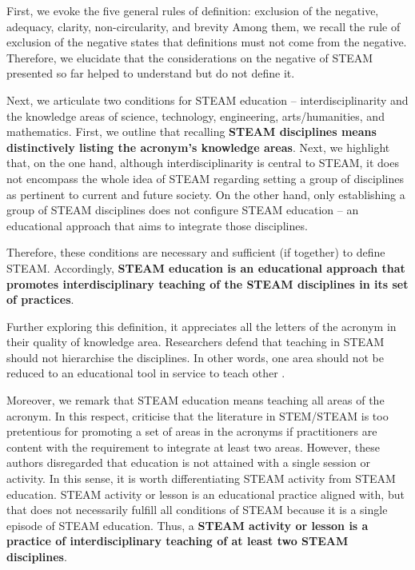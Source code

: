 \documentclass[english]{textolivre}
\begin{document}
First, we evoke the five general rules of definition: exclusion of the negative, adequacy, clarity, non-circularity, and brevity \cite{machlarz2011general} Among them, we recall the rule of exclusion of the negative states that definitions must not come from the negative. Therefore, we elucidate that the considerations on the negative of STEAM presented so far helped to understand but do not define it.

Next, we articulate two conditions for STEAM education – interdisciplinarity and the knowledge areas of science, technology, engineering, arts/humanities, and mathematics. First, we outline that recalling \textbf{STEAM disciplines means distinctively listing the acronym’s knowledge areas}. Next, we highlight that, on the one hand, although interdisciplinarity is central to STEAM, it does not encompass the whole idea of STEAM regarding setting a group of disciplines as pertinent to current and future society. On the other hand, only establishing a group of STEAM disciplines does not configure STEAM education – an educational approach that aims to integrate those disciplines.

Therefore, these conditions are necessary and sufficient (if together) to define STEAM. Accordingly, \textbf{STEAM education is an educational approach that promotes interdisciplinary teaching of the STEAM disciplines in its set of practices}.

Further exploring this definition, it appreciates all the letters of the acronym in their quality of knowledge area. Researchers defend that teaching in STEAM should not hierarchise the disciplines. In other words, one area should not be reduced to an educational tool in service to teach other \cite{mejias_trouble_2021}.

Moreover, we remark that STEAM education means teaching all areas of the acronym. In this respect, \textcite{toma_stem_2021} criticise that the literature in STEM/STEAM is too pretentious for promoting a set of areas in the acronyms if practitioners are content with the requirement to integrate at least two areas. However, these authors disregarded that education is not attained with a single session or activity. In this sense, it is worth differentiating STEAM activity from STEAM education. STEAM activity or lesson is an educational practice aligned with, but that does not necessarily fulfill all conditions of STEAM because it is a single episode of STEAM education. Thus, a \textbf{STEAM activity or lesson is a practice of interdisciplinary teaching of at least two STEAM disciplines}.
\end{document}
